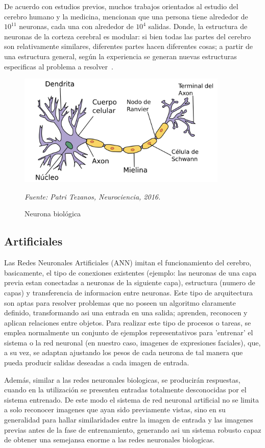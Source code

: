 De acuerdo con estudios previos, muchos trabajos orientados al estudio del cerebro humano y la medicina, mencionan que una persona tiene alrededor de $10^{11}$ neuronas, cada una con alrededor de $10^4$ salidas. Donde, la estructura de neuronas de la corteza cerebral es modular: si bien todas las partes del cerebro son relativamente similares, diferentes partes hacen diferentes cosas; a partir de una estructura general, según la experiencia se generan nuevas estructuras especificas al problema a resolver~\cite{16pusiol2014redes}. 


\begin{figure}[H]
		\centering
		\includegraphics[width=100mm]{Imagenes/neurona_biologica.png}
		\caption{Neurona biológica}
		\vspace{0.15cm}
		\textit{Fuente: Patri Tezanos, Neurociencia, 2016.}
		\label{fig:neurona_biologica}
\end{figure} 


\subsection{Artificiales}
Las Redes Neuronales Artificiales (ANN) imitan el funcionamiento del cerebro, basicamente,  el tipo de  conexiones existentes (ejemplo: las neuronas de una capa previa estan conectadas a neuronas de la siguiente capa), estructura (numero de capas) y transferencia de informacion entre neuronas. Este tipo de arquitectura son aptas para resolver problemas que no poseen un algoritmo claramente definido, transformando asi una entrada en una salida; aprenden, reconocen y aplican relaciones entre objetos. Para realizar este tipo de procesos o tareas, se emplea normalmente un conjunto de ejemplos representativos para 'entrenar' el sistema o la red neuronal (en nuestro caso, imagenes de expresiones faciales), que, a su vez, se adaptan ajustando los pesos de cada neurona de tal manera que pueda producir salidas deseadas a cada imagen de entrada.

Además, similar a las redes neuronales biologicas, se producirán respuestas, cuando en la utilización se presenten entradas totalmente desconocidas por el sistema entrenado. De este modo el sistema de red neuronal artificial no se limita a solo reconocer imagenes que ayan sido previamente vistas, sino en su generalidad para hallar similaridades entre la imagen de entrada y las imagenes previas antes de la fase de entrenamiento, generando asi un sistema robusto capaz de obtener una semejansa enorme a las redes neuronales biologicas.

